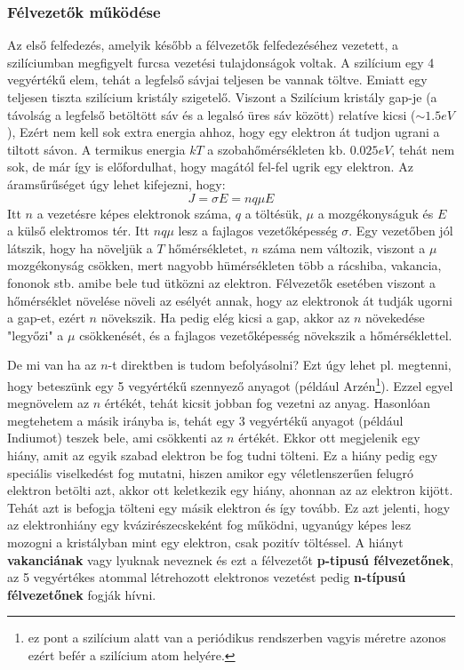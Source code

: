 \documentclass[../main.tex]{subfiles}
\begin{document}
\subsubsection{Félvezetők működése}
Az első felfedezés, amelyik később a félvezetők felfedezéséhez vezetett, a szilíciumban megfigyelt furcsa vezetési tulajdonságok voltak. A szilícium egy 4 vegyértékű elem, tehát a legfelső sávjai teljesen be vannak töltve. Emiatt egy teljesen tiszta szilícium kristály szigetelő.
Viszont a Szilícium kristály gap-je (a távolság a legfelső betöltött sáv és a legalsó üres sáv között) relatíve kicsi ($\sim 1.5 eV$), Ezért nem kell sok extra energia ahhoz, hogy egy elektron át tudjon ugrani a tiltott sávon. A termikus energia $kT$ a szobahőmérsékleten kb. $0.025 eV$, 
tehát nem sok, de már így is előfordulhat, hogy magától fel-fel ugrik egy elektron. Az áramsűrűséget úgy lehet kifejezni, hogy:
\begin{equation}
    J = \sigma E = nq \mu E
\end{equation}
Itt $n$ a vezetésre képes elektronok száma, $q$ a töltésük, $\mu$ a mozgékonyságuk és $E$ a külső elektromos tér. Itt $nq\mu$ lesz a fajlagos vezetőképesség $\sigma$.
Egy vezetőben jól látszik, hogy ha növeljük a $T$ hőmérsékletet, $n$ száma nem változik, viszont a $\mu$ mozgékonyság csökken, mert nagyobb hümérsékleten több a rácshiba, vakancia, fononok stb. amibe bele tud ütközni az elektron.
Félvezetők esetében viszont a hőmérséklet növelése növeli az esélyét annak, hogy az elektronok át tudják ugorni a gap-et, ezért $n$ növekszik. Ha pedig elég kicsi a gap, akkor az $n$ növekedése "legyőzi" a $\mu$ csökkenését, és a fajlagos vezetőképesség növekszik a hőmérséklettel. 

De mi van ha az $n$-t direktben is tudom befolyásolni? Ezt úgy lehet pl. megtenni, hogy beteszünk egy 5 vegyértékű szennyező anyagot (például Arzén\footnote{
    ez pont a szilícium alatt van a periódikus rendszerben vagyis méretre azonos ezért befér a szilícium atom helyére.
}). Ezzel egyel megnövelem az $n$ értékét, tehát kicsit jobban fog vezetni az anyag. Hasonlóan megtehetem a másik irányba is, tehát egy 3 vegyértékű anyagot (például Indiumot) teszek bele, ami csökkenti az $n$ értékét. Ekkor ott megjelenik egy hiány, amit az egyik szabad elektron be fog tudni tölteni.
Ez a hiány pedig egy speciális viselkedést fog mutatni, hiszen amikor egy véletlenszerűen felugró elektron betölti azt, akkor ott keletkezik egy hiány, ahonnan az az elektron kijött. Tehát azt is befogja tölteni egy másik elektron és így tovább.
Ez azt jelenti, hogy az elektronhiány egy kvázirészecskeként fog működni, ugyanúgy képes lesz mozogni a kristályban mint egy elektron, csak pozitív töltéssel. A hiányt \textbf{vakanciának} vagy lyuknak neveznek és ezt a félvezetőt \textbf{p-tipusú félvezetőnek}, az 5 vegyértékes atommal létrehozott elektronos vezetést pedig \textbf{n-típusú félvezetőnek} fogják hívni.
\end{document}
